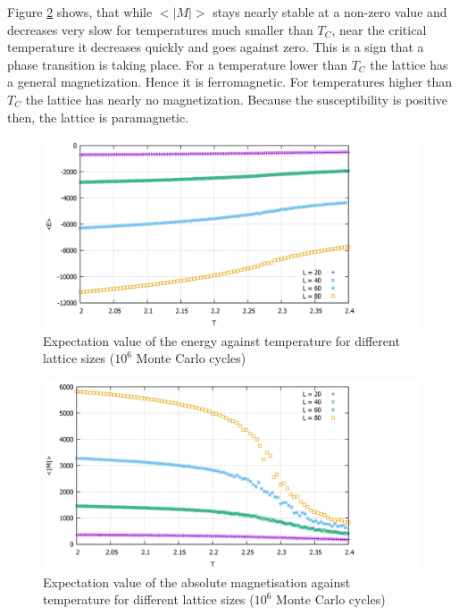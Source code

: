\documentclass[10pt,a4paper]{article}
\begin{document}
Figure \ref{absm_all} shows, that while $<|M|>$ stays nearly stable at a non-zero value and decreases very slow for temperatures much smaller than $T_C$, near the critical temperature it decreases quickly and goes against zero. This is a sign that a phase transition is taking place. For a temperature lower than $T_C$ the lattice has a general magnetization. Hence it is ferromagnetic. For temperatures higher than $T_C$ the lattice has nearly no magnetization. Because the susceptibility is positive then, the  lattice is paramagnetic.


\begin{figure}[h]
	\includegraphics[scale = 0.25]{E_all.png}
	\centering
	\caption{Expectation value of the energy against temperature for different lattice sizes ($10^6$ Monte Carlo cycles)}
	\label{e_all}
\end{figure}

\begin{figure}[h]
	\includegraphics[scale = 0.25]{absm_all.png}
	\centering
	\caption{Expectation value of the absolute magnetisation against temperature for different lattice sizes ($10^6$ Monte Carlo cycles)}
	\label{absm_all}
\end{figure}
\end{document}
